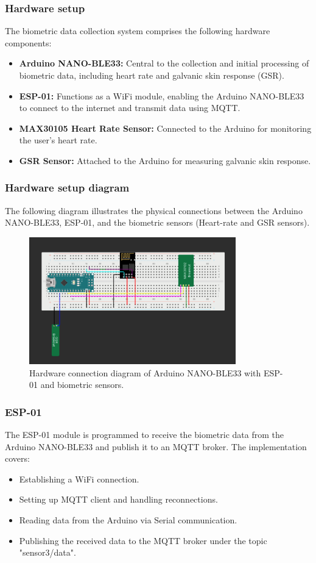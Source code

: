 \subsubsection{Hardware setup}
The biometric data collection system comprises the following hardware components:
\begin{itemize}
    \item \textbf{Arduino NANO-BLE33:} Central to the collection and initial processing of biometric data, including heart rate and galvanic skin response (GSR).
    \item \textbf{ESP-01:} Functions as a WiFi module, enabling the Arduino NANO-BLE33 to connect to the internet and transmit data using MQTT.
    \item \textbf{MAX30105 Heart Rate Sensor:} Connected to the Arduino for monitoring the user's heart rate.
    \item \textbf{GSR Sensor:} Attached to the Arduino for measuring galvanic skin response.
\end{itemize}

\subsubsection{Hardware setup diagram}
The following diagram illustrates the physical connections between the Arduino NANO-BLE33, ESP-01, and the biometric sensors (Heart-rate and GSR sensors).

\begin{figure}[h]
    \centering
    \includegraphics[width=0.8\textwidth]{../images/gsr&heart.png}
    \caption{Hardware connection diagram of Arduino NANO-BLE33 with ESP-01 and biometric sensors.}
    \label{fig:hardware-setup}
\end{figure}


\subsubsection{ESP-01}
The ESP-01 module is programmed to receive the biometric data from the Arduino NANO-BLE33 and publish it to an MQTT broker. The implementation covers:
\begin{itemize}
    \item Establishing a WiFi connection.
    \item Setting up MQTT client and handling reconnections.
    \item Reading data from the Arduino via Serial communication.
    \item Publishing the received data to the MQTT broker under the topic "sensor3/data".
\end{itemize}

